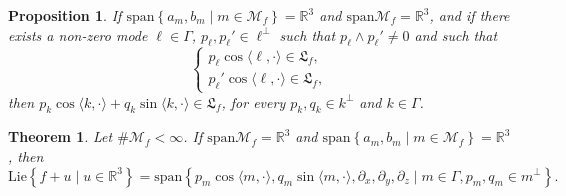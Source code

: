 \documentclass[10pt,a4paper]{amsart}
\newtheorem{prop}{Proposition}
\newtheorem{theorem}{Theorem}
\newcommand{\M}{{\mathcal M}}
\newcommand{\R}{{\mathbb R}}
\newcommand{\la}{\langle}
\newcommand{\p}{\partial}
\newcommand{\ra}{\rangle}
\newcommand{\we}{\wedge}
\begin{document}
\begin{prop} \label{generation of every modes dimV0=3 dim I0=3}
    If $\mathrm{span}\left\{a_m,b_m \mid m \in \M_f \right\}=\R^3$ and $\mathrm{span}\M_f = \R^3$, and if there exists a non-zero mode $\ell \in \Gamma$, $p_{\ell},p_\ell'\in \ell^{\perp}$ such that $p_\ell\we p_\ell'\neq 0$ and such that 
    \begin{equation*}
        \left\{\begin{array}{ll}
             p_\ell \cos \la \ell,\cdot \ra \in \mathfrak{L}_f,\\
             p_\ell'\cos \la \ell,\cdot \ra \in \mathfrak{L}_f,
        \end{array}\right.
    \end{equation*}
    then $p_k\cos \la k,\cdot \ra +q_k \sin \la k,\cdot \ra \in \mathfrak{L}_f$, for every $p_k,q_k\in k^{\perp}$ and $k \in \Gamma$.
\end{prop}

\begin{theorem} \label{theorem : algebra dim3 span3}
    Let $\# \M_f < \infty$. If $\mathrm{span}\M_f=\R^3$ and $\mathrm{span}\left\{a_m,b_m \mid m \in \M_f\right\}=\R^3$,
    then  
    \begin{equation*}
        \mathrm{Lie}\left\{f+u \mid u \in \R^3\right\}=\mathrm{span} \left\{p_m\cos\la m,\cdot \ra,q_m\sin\la m,\cdot\ra,\p_x,\p_y,\p_z \mid m\in \Gamma,p_m,q_m \in m^{\perp}\right\}.
    \end{equation*}
\end{theorem}
\end{document}
